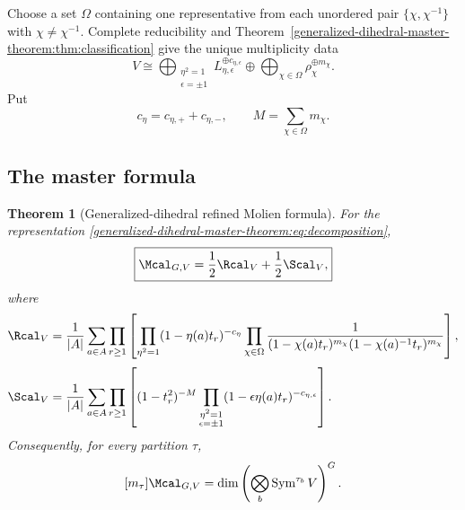 \documentclass[10pt]{article}
\newcommand{\Sym}{\operatorname{Sym}}
\newtheorem{theorem}{Theorem}
\begin{document}
Choose a set $\Omega$ containing one representative from each unordered pair
$\{\chi,\chi^{-1}\}$ with $\chi\ne\chi^{-1}$.  Complete reducibility and
Theorem~\ref{generalized-dihedral-master-theorem:thm:classification} give the unique multiplicity data
\begin{equation}\label{generalized-dihedral-master-theorem:eq:decomposition}
  V\cong
  \bigoplus_{\substack{\eta^2=1\\\epsilon=\pm1}}
    L_{\eta,\epsilon}^{\oplus c_{\eta,\epsilon}}
  \oplus
  \bigoplus_{\chi\in\Omega}
    \rho_\chi^{\oplus m_\chi}.
\end{equation}
Put
\[
  c_\eta=c_{\eta,+}+c_{\eta,-},
  \qquad M=\sum_{\chi\in\Omega}m_\chi.
\]

\subsection{The master formula}

\begin{theorem}[Generalized-dihedral refined Molien formula]
\label{generalized-dihedral-master-theorem:thm:master}
For the representation \eqref{generalized-dihedral-master-theorem:eq:decomposition},
\[
  \boxed{\Mcal_{G,V}=\frac12\Rcal_V+\frac12\Scal_V,}
\]
where
\begin{align}
\Rcal_V
&=\frac1{|A|}\sum_{a\in A}\prod_{r\geq1}
\left[
\prod_{\eta^2=1}(1-\eta(a)t_r)^{-c_\eta}
\prod_{\chi\in\Omega}
\frac{1}{
(1-\chi(a)t_r)^{m_\chi}
(1-\chi(a)^{-1}t_r)^{m_\chi}}
\right],\label{generalized-dihedral-master-theorem:eq:rotation}\\[3pt]
\Scal_V
&=\frac1{|A|}\sum_{a\in A}\prod_{r\geq1}
\left[
(1-t_r^2)^{-M}
\prod_{\substack{\eta^2=1\\\epsilon=\pm1}}
(1-\epsilon\eta(a)t_r)^{-c_{\eta,\epsilon}}
\right].\label{generalized-dihedral-master-theorem:eq:reflection}
\end{align}
Consequently, for every partition $\tau$,
\[
  [m_\tau]\Mcal_{G,V}
  =\dim\left(
    \bigotimes_b\Sym^{\tau_b}V
  \right)^G.
\]
\end{theorem}
\end{document}
